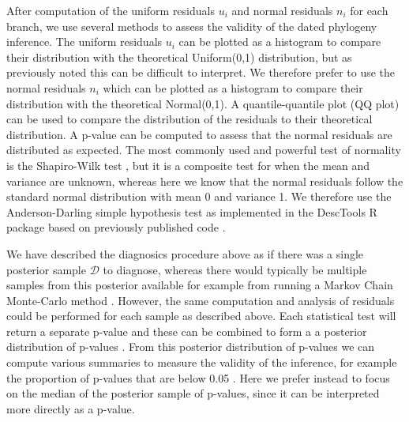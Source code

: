 \documentclass{article}
\begin{document}
After computation of the uniform residuals $u_i$ and normal residuals $n_i$ for each branch,
we use several methods to assess the validity of the dated phylogeny inference.
The uniform residuals $u_i$ can be plotted as a histogram to compare their
distribution with the theoretical Uniform(0,1) distribution, but as previously noted this can
be difficult to interpret. We therefore prefer to use the normal residuals $n_i$ which can be plotted
as a histogram to compare their distribution with the theoretical Normal(0,1).
A quantile-quantile plot (QQ plot) can be used to compare the distribution of the residuals
to their theoretical distribution.
A p-value can be computed to assess that the normal
residuals are distributed as expected. 
The most commonly used and powerful test of normality 
is the Shapiro-Wilk test \citep{razaliPowerComparisonsShapiroWilk2011},
but it is a composite test for when the mean and variance
are unknown, whereas here we know that the
normal residuals follow the standard normal distribution with
mean 0 and variance 1. We therefore use the
Anderson-Darling simple hypothesis 
test \citep{lewis1961distribution} 
as implemented in the DescTools R package
based on previously published code
\citep{marsagliaEvaluatingAndersonDarlingDistribution2004}. 

We have described the diagnosics procedure above as if there was a single posterior
sample $\mathcal{D}$ to diagnose, whereas there would typically be multiple samples
from this posterior available for example from running a Markov Chain Monte-Carlo
method \citep{Didelot2018}. However, the same computation and analysis of residuals
could be performed for each sample as described above. Each statistical test will
return a separate p-value and these can be combined to form a 
a posterior distribution of p-values \citep{streftarisNonexponentialToleranceInfection2012,lauNewModelDiagnostics2014,gibsonComparisonAssessmentEpidemic2018}.
From this posterior distribution of p-values we can compute
various summaries to measure the validity of the inference,
for example the proportion of p-values that are below 0.05
\citep{lauNewModelDiagnostics2014}. Here we prefer instead
to focus on the median of the posterior sample of p-values,
since it can be interpreted more directly as a p-value.
\end{document}
